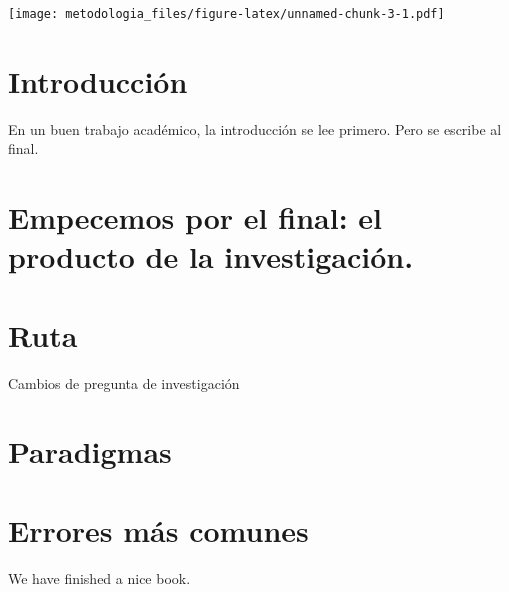 \documentclass[
]{book}
\begin{document}
\texttt{[image: metodologia\_files/figure-latex/unnamed-chunk-3-1.pdf]}

\hypertarget{intro}{%
\chapter{Introducción}\label{intro}}

En un buen trabajo académico, la introducción se lee primero. Pero se escribe al final.

\hypertarget{empecemos-por-el-final-el-producto-de-la-investigaciuxf3n.}{%
\chapter{Empecemos por el final: el producto de la investigación.}\label{empecemos-por-el-final-el-producto-de-la-investigaciuxf3n.}}

\hypertarget{ruta}{%
\chapter{Ruta}\label{ruta}}

Cambios de pregunta de investigación

\hypertarget{paradigmas}{%
\chapter{Paradigmas}\label{paradigmas}}

\hypertarget{errores-muxe1s-comunes}{%
\chapter{Errores más comunes}\label{errores-muxe1s-comunes}}

We have finished a nice book.

  
\end{document}
